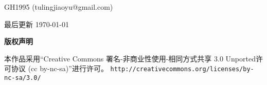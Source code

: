 \thispagestyle{plain}
\begin{center}
  {\LARGE\textbf{\BookTitle}}

  \vspace{1em}
  {\large GH1995 (tulingjiaoyu@gmail.com)}

  \vspace{1ex}

  \vspace{2ex}
  最后更新 \today

  \vspace{1em}
  \textbf{\large 版权声明}
\end{center}
\noindent 本作品采用“Creative Commons 署名-非商业性使用-相同方式共享 3.0 Unported许可协议
(cc by-nc-sa)”进行许可。
\texttt{\small http://creativecommons.org/licenses/by-nc-sa/3.0/}

\vspace{1em}
% 
